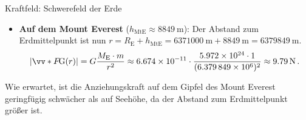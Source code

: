 \begin{examplebox}[breakable]{Kraftfeld: Schwerefeld der Erde}
\begin{itemize}[itemsep=1.5pt]
    \item \textbf{Auf dem Mount Everest} ($h_{\text{MtE}} \approx \SI{8849}{\meter}$):
    Der Abstand zum Erdmittelpunkt ist nun $r = R_\text{E} + h_{\text{MtE}} = \SI{6371000}{\meter} + \SI{8849}{\meter} = \SI{6379849}{\meter}$.
    \begin{equation}
        |\ivecS{F}{\text{G}}(r)| = G \frac{M_\text{E} \cdot m}{r^2} \approx \num{6.674e-11} \cdot \frac{\num{5.972e24} \cdot \num{1}}{(\num{6.379849e6})^2} \approx \SI{9.79}{\newton} \mDot
    \end{equation}
\end{itemize}
Wie erwartet, ist die Anziehungskraft auf dem Gipfel des Mount Everest geringfügig schwächer als auf Seehöhe, da der Abstand zum Erdmittelpunkt größer ist.
\end{examplebox}

